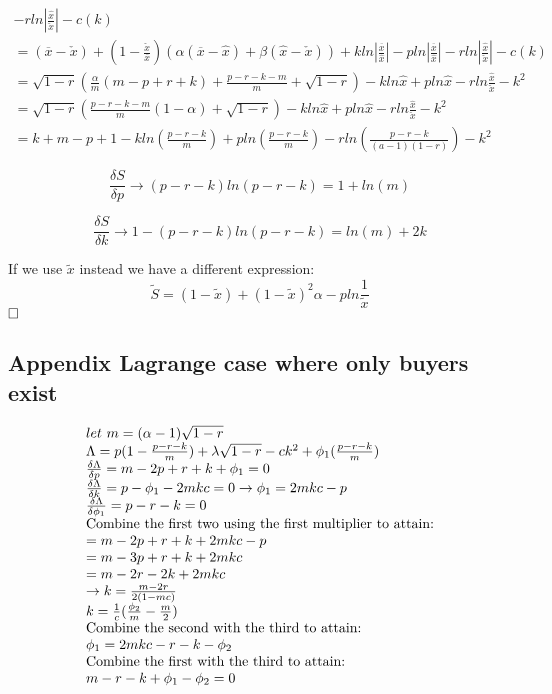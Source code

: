 \documentclass{article}
\begin{document}
{\[\begin{array}{ll}
 - rln|\frac{\hat{x}}{\check{x}}| - c(k) \\
=(\overline{x} - \check{x})+ (1-\frac{\check{x}}{\overline{x}})(\alpha(\overline{x} - \hat{x}) + \beta(\hat{x}-\check{x}))
 + kln|\frac{\overline{x}}{\hat{x}}| - pln|\frac{\overline{x}}{\hat{x}}| 
 - rln|\frac{\hat{x}}{\check{x}}| - c(k) \\
= \sqrt{1-r}(\frac{\alpha}{m}(m-p+r+k)+\frac{p-r-k-m}{m}+\sqrt{1-r}) - kln\hat{x}+pln \hat{x}-r ln \frac{\hat{x}}{\check{x}}-k^2 \\
=\sqrt{1-r}(\frac{p-r-k-m}{m}(1-\alpha)+\sqrt{1-r}) - kln\hat{x}+pln \hat{x}-r ln \frac{\hat{x}}{\check{x}}-k^2 \\
=k+m-p + 1 - kln(\frac{p-r-k}{m})+pln (\frac{p-r-k}{m})-r ln (\frac{p-r-k}{(a-1)(1-r)})-k^2
\end{array}
\]}

\[ 
\frac{\delta S}{\delta p} \rightarrow (p-r-k)ln(p-r-k)=1+ln(m)
\]

\[ 
\frac{\delta S}{\delta k} \rightarrow 1-(p-r-k)ln(p-r-k)=ln(m) + 2k
\]

If we use $\tilde{x}$ instead we have a different expression:
\[
\tilde{S}=(1-\tilde{x})+(1-\tilde{x})^2 \alpha-p ln \frac{1}{\tilde{x}}
\]
$\hfill \square$

\subsection{Appendix Lagrange case where only buyers exist }
\[
\begin{array}{ll}
let~m=(\alpha-1)\sqrt{1-r} \\
\Lambda = p(1-\frac{p-r-k}{m})+\lambda\sqrt{1-r}-ck^2+\phi_1(\frac{p-r-k}{m})  \\
\frac{\delta \Lambda}{\delta p} = m-2p+r+k+\phi_1=0 \\
\frac{\delta \Lambda}{\delta k} = p - \phi_1-2mkc=0 \rightarrow \phi_1=2mkc-p \\
\frac{\delta \Lambda}{\delta \phi_1} = p-r-k=0 \\
\textnormal{Combine the first two using the first multiplier to attain:}\\ 
= m-2p+r+k+2mkc-p \\
= m-3p+r+k+2mkc \\
= m-2r-2k+2mkc \\
\rightarrow k = \frac{m-2r}{2(1-mc)} \\
k = \frac{1}{c}(\frac{\phi_2}{m}-\frac{m}{2}) \\
\textnormal{Combine the second with the third to attain: }\\
\phi_1=2mkc-r-k-\phi_2 \\
\textnormal{Combine the first with the third to attain: }\\
m-r-k+\phi_1-\phi_2=0 \\
\end{array}
\]
\end{document}
